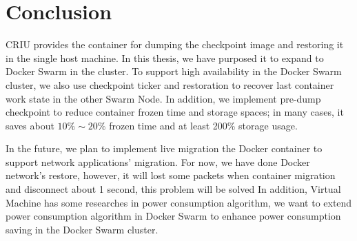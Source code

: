\chapter{Conclusion}
\label{chap:conclusion}
CRIU provides the container for dumping the checkpoint image and restoring it in the single host machine. In this thesis, we have purposed it to expand to Docker Swarm in the cluster.
To support high availability in the Docker Swarm cluster, we also use checkpoint ticker and restoration to recover last container work state in the other Swarm Node. In addition, we implement pre-dump checkpoint to reduce container frozen time and storage spaces; in many cases, it saves about $ 10\% \sim 20\% $ frozen time and at least 200\% storage usage.

In the future, we plan to implement live migration the Docker container to support network applications' migration.
For now, we have done Docker network's restore, however, it will lost some packets when container migration and disconnect about 1 second, this problem will be solved
In addition, Virtual Machine has some researches in power consumption algorithm, we want to extend power consumption algorithm in Docker Swarm to enhance power consumption saving in the Docker Swarm cluster.